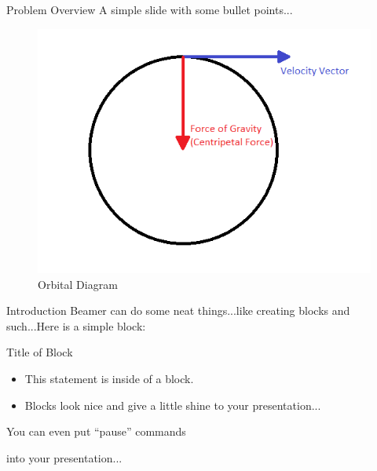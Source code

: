 \documentclass{beamer}  %
\begin{document}
\begin{frame}{Problem Overview}
A simple slide with some bullet points...
\begin{figure}
\label{fig:1}
\includegraphics[scale=0.5]{orbitalDiagram}
\caption{Orbital Diagram}
\end{figure}
\end{frame}

\begin{frame}{Introduction}
Beamer can do some neat things...like creating blocks and such...Here is a simple block:

\begin{block}{Title of Block}
\begin{itemize}
\item This statement is inside of a block.
\item Blocks look nice and give a little shine to your presentation...
\end{itemize}
\end{block}
You can even put ``pause'' commands 

\pause

into your presentation...

\end{frame}
\end{document}
